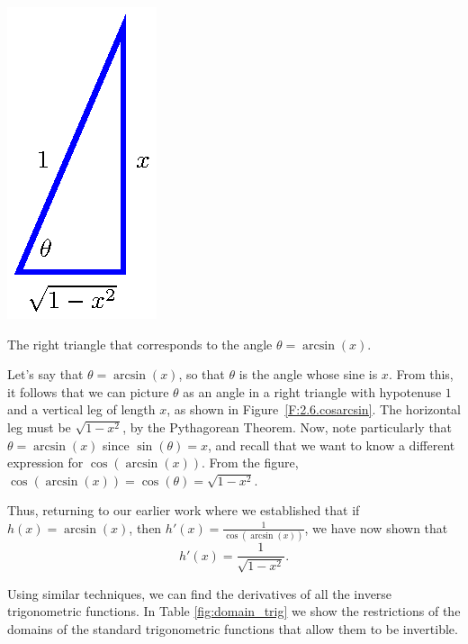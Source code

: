 \begin{marginfigure} %
\includegraphics{figures/2_6_cosarcsin.eps}
\caption{The right triangle that corresponds to the angle $\theta = \arcsin(x)$.} \label{F:2.6.cosarcsin}
\end{marginfigure}

Let's say that $\theta = \arcsin(x)$, so that $\theta$ is the angle whose sine is $x$.  From this, it follows that we can picture $\theta$ as an angle in a right triangle with hypotenuse $1$ and a vertical leg of length $x$, as shown in Figure~\ref{F:2.6.cosarcsin}.  The horizontal leg must be $\sqrt{1-x^2}$, by the Pythagorean Theorem.  Now, note particularly that $\theta = \arcsin(x)$ since $\sin(\theta) = x$, and recall that we want to know a different expression for $\cos(\arcsin(x))$.  From the figure, $\cos(\arcsin(x)) = \cos(\theta) = \sqrt{1-x^2}.$

Thus, returning to our earlier work where we established that if $h(x) = \arcsin(x)$, then $h'(x) = \frac{1}{\cos(\arcsin(x))}$, we have now shown that
$$h'(x) = \frac{1}{\sqrt{1-x^2}}.$$


Using similar techniques, we can find the derivatives of all the inverse trigonometric functions. In Table \ref{fig:domain_trig} we show the restrictions of the domains of the standard trigonometric functions that allow them to be invertible.

